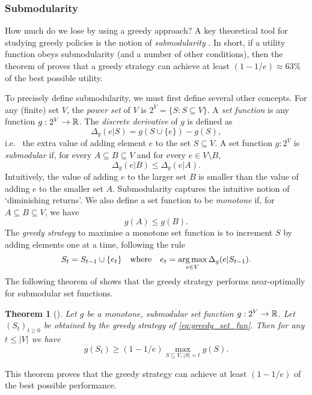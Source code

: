 \documentclass[a4paper, 10pt]{report}
\theoremstyle{plain}
\newtheorem{theorem}{Theorem}
\begin{document}
	\subsubsection{Submodularity}
	\label{sec:submodular}
	How much do we lose by using a greedy approach?
	A key theoretical tool for studying greedy policies is the notion of \emph{submodularity} \citep{krause2014submodular}.
	In short, if a utility function obeys submodularity (and a number of other conditions), then the theorem of \citet{nemhauser1978analysis} proves that a greedy strategy can achieve at least $(1 - 1/e) \approx 63\%$ of the best possible utility.
	
	To precisely define submodularity, we must first define several other concepts.
	For any (finite) set $V$, the \emph{power set} of $V$ is $2^V = \{ S: S \subseteq V \}$.
	A \emph{set function} is any function $g: 2^V \to {\mathbb{R}}$.
	The \emph{discrete derivative} of $g$ is defined as 
	\begin{equation}
	\Delta_g (e | S)  = g( S \cup \{ e \}) - g(S),
	\end{equation}
	i.e.~ the extra value of adding element $e$ to the set $S \subseteq V$.
	A set function $g: 2^V $ is \emph{submodular} if, for every $A \subseteq B \subseteq V$ and for every $e \in V \setminus B$,
	\begin{equation}
	\Delta_g(e|B) \le \Delta_g(e|A).
	\end{equation}
	Intuitively, the value of adding $e$ to the larger set $B$ is smaller than the value of adding $e$ to the smaller set $A$.
	Submodularity captures the intuitive notion of `diminishing returns'.
	We also define a set function to be \emph{monotone} if, for $A \subseteq B \subseteq V$, we have
	\begin{equation}
	g(A) \le g(B).
	\end{equation}
	The \emph{greedy strategy} to maximise a monotone set function is to increment $S$ by adding elements one at a time, following the rule
	\begin{equation}
	\label{eq:greedy_set_fun}
	S_t = S_{t-1} \cup \{ e_t \} \quad\text{where}\quad e_t = \operatorname*{arg\,max}_{e\in V } \Delta_g(e|S_{t-1}).
	\end{equation}
	The following theorem of \citet{nemhauser1978analysis} shows that the greedy strategy performs near-optimally for submodular set functions.
	\begin{theorem}[\citet{nemhauser1978analysis}] \label{thm:submodular}
		Let $g$ be a monotone, submodular set function $g : 2^V \to {\mathbb{R}}$.
		Let $(S_t)_{t\ge 0}$ be obtained by the greedy strategy of \eqref{eq:greedy_set_fun}.
		Then for any $t\le |V|$ we have
		\begin{equation}
		g(S_t) \ge \left(1 - 1/e\right) \max_{S \subseteq V, |S| = t} g(S).
		\end{equation}
	\end{theorem}
	This theorem proves that the greedy strategy can achieve at least $(1 - 1/e)$ of the best possible performance.
	
\end{document}
